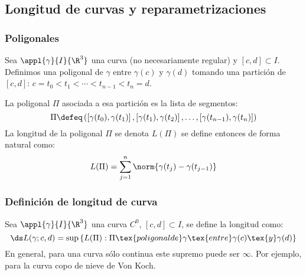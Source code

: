 \subsection{Longitud de curvas y reparametrizaciones}
\subsubsection{Poligonales}
Sea $\appl{\gamma}{I}{\R^3}$ una curva (no necesariamente regular) y $\left[c, d\right] \subset I$. Definimos una poligonal de $\gamma$ entre $\gamma(c)$ y $\gamma(d)$ tomando una partición de $\left[c, d\right]$: $c=t_0<t_1<\cdots<t_{n-1}<t_n=d$.

La poligonal $\Pi$ asociada a esa partición es la lista de segmentos:
\[\Pi\defeq\left(\left[\gamma(t_0), \gamma(t_1)\right], \left[\gamma(t_1), \gamma(t_2)\right], \dots, \left[\gamma(t_{n-1}), \gamma(t_n)\right]\right)\]
La longitud de la poligonal $\Pi$ se denota $L(\Pi)$ se define entonces de forma natural como:
\[L(\Pi)=\sum_{j=1}^n \norm{\gamma(t_j)-\gamma(t_{j-1})}\]

\subsubsection{Definición de longitud de curva}
\begin{defn}
	Sea $\appl{\gamma}{I}{\R^3}$ una curva $C^0$, $\left[c,d\right] \subset  I$, se define la longitud como: \[\ds L(\gamma; c, d)=\sup \left\{L(\Pi) : \Pi\tex{ poligonal de } \gamma \tex{ entre }\gamma(c)\tex{ y }\gamma(d)\right\}\]
	En general, para una curva sólo continua este supremo puede ser $\infty$. Por ejemplo, para la curva copo de nieve de Von Koch.
\end{defn}

